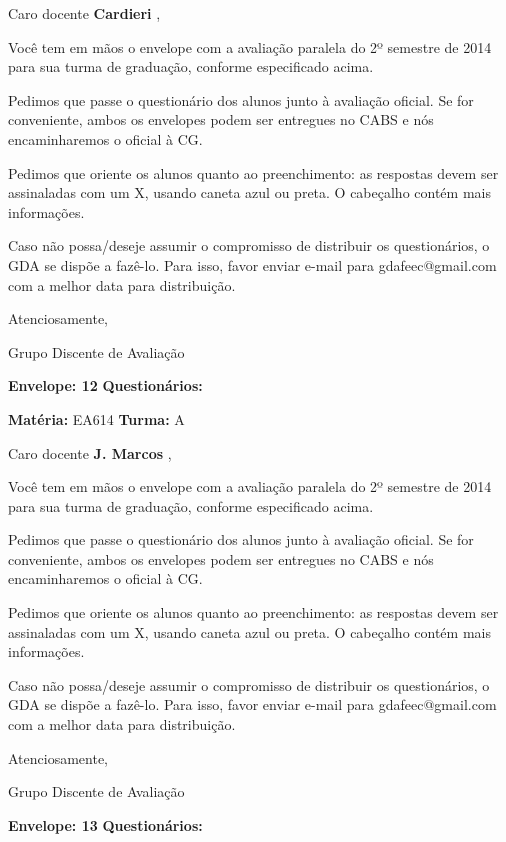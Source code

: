 \documentclass[a5paper]{letter}
\begin{document}
Caro docente {\bf Cardieri }, 

	Você tem em mãos o envelope com a avaliação paralela do 2º semestre de 2014 para sua turma de graduação, conforme especificado acima.

	Pedimos que passe o questionário dos alunos junto à avaliação oficial. Se for conveniente, ambos os envelopes podem ser entregues no CABS e nós encaminharemos o oficial à CG.

Pedimos que oriente os alunos quanto ao preenchimento: as respostas devem ser assinaladas com um X, usando caneta azul ou preta. O cabeçalho contém mais informações.

	Caso não possa/deseje assumir o compromisso de distribuir os questionários, o GDA se dispõe a fazê-lo. Para isso, favor enviar e-mail para gdafeec@gmail.com com a melhor data para distribuição.


Atenciosamente, 

Grupo Discente de Avaliação

\vspace{0.5cm}

{\bf Envelope: 12 }		\hfill	{\bf Questionários:} \hspace{2cm}

\newpage
\thispagestyle{empty}

\hfill {\bf Matéria:} EA614 {\bf Turma:} A

Caro docente {\bf J. Marcos }, 

	Você tem em mãos o envelope com a avaliação paralela do 2º semestre de 2014 para sua turma de graduação, conforme especificado acima.

	Pedimos que passe o questionário dos alunos junto à avaliação oficial. Se for conveniente, ambos os envelopes podem ser entregues no CABS e nós encaminharemos o oficial à CG.

Pedimos que oriente os alunos quanto ao preenchimento: as respostas devem ser assinaladas com um X, usando caneta azul ou preta. O cabeçalho contém mais informações.

	Caso não possa/deseje assumir o compromisso de distribuir os questionários, o GDA se dispõe a fazê-lo. Para isso, favor enviar e-mail para gdafeec@gmail.com com a melhor data para distribuição.


Atenciosamente, 

Grupo Discente de Avaliação

\vspace{0.5cm}

{\bf Envelope: 13 }		\hfill	{\bf Questionários:} \hspace{2cm}
\end{document}

